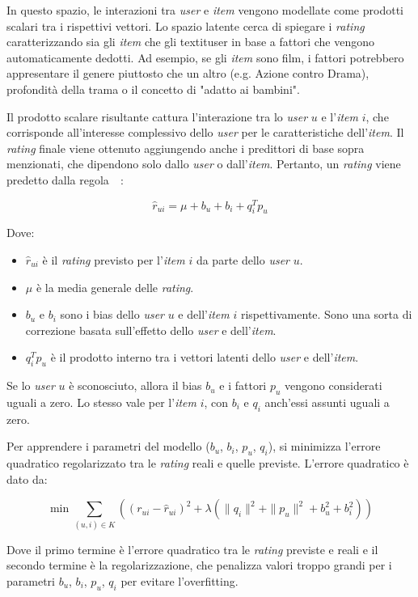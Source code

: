In questo spazio, le interazioni tra \textit{user} e \textit{item} vengono modellate come prodotti scalari tra i rispettivi vettori. Lo spazio latente cerca di spiegare i \textit{rating} caratterizzando sia gli \textit{item} che gli textit{user} in base a fattori che vengono automaticamente dedotti. Ad esempio, se gli \textit{item} sono film, i fattori potrebbero appresentare il genere piuttosto che un altro (e.g. Azione contro Drama), profondità della trama o il concetto di "adatto ai bambini".

Il prodotto scalare risultante cattura l'interazione tra lo \textit{user} $u$ e l'\textit{item} $i$, che corrisponde all'interesse complessivo dello \textit{user} per le caratteristiche dell'\textit{item}. Il \textit{rating} finale viene ottenuto aggiungendo anche i predittori di base sopra menzionati, che dipendono solo dallo \textit{user} o dall'\textit{item}. Pertanto, un \textit{rating} viene predetto dalla regola~\cite{SVD_analysis}~\cite{Recommendation_book}:

\[
\hat{r}_{ui} = \mu + b_u + b_i + q_i^T p_u
\]

Dove:
\begin{itemize}
    \item $ \hat{r}_{ui} $ è il \textit{rating} previsto per
    l'\textit{item} $i$ da parte dello \textit{user} $u$.
    \item $ \mu $ è la media generale delle \textit{rating}.
    \item $ b_u $ e $ b_i $ sono i bias dello \textit{user} $u$ e dell'\textit{item} $i$ rispettivamente. Sono una sorta di correzione basata sull'effetto dello \textit{user} e dell'\textit{item}.
    \item $ q_i^T p_u $ è il prodotto interno tra i vettori latenti dello \textit{user} e dell'\textit{item}.
\end{itemize}

Se lo \textit{user} $u$ è sconosciuto, allora il bias $b_u$ e i fattori $p_u$ vengono considerati uguali a zero. Lo stesso vale per
l'\textit{item} $i$, con $b_i$ e $q_i$ anch'essi assunti uguali a zero.

Per apprendere i parametri del modello ($b_u$, $b_i$, $p_u$, $q_i$), si minimizza l'errore quadratico regolarizzato tra le \textit{rating} reali e quelle previste. L'errore quadratico è dato da:

\[
\min \sum\limits_{(u,i) \in K} \left( (r_{ui} - \hat{r}_{ui})^2 + \lambda (\|q_i\|^2 + \|p_u\|^2 + b_u^2 + b_i^2) \right)
\]


Dove il primo termine è l'errore quadratico tra le \textit{rating} previste e reali e il secondo termine è la regolarizzazione, che penalizza valori troppo grandi per i parametri $b_u$, $b_i$, $p_u$, $q_i$ per evitare l'overfitting.

